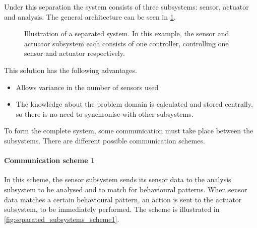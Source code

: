 Under this separation the system consists of three subsystems: sensor, actuator and analysis.  The general architecture can be seen in \cref{fig:separated_subsystems}.

\begin{figure}[htbp]
\centering
{}
\caption{Illustration of a separated system. In this example, the sensor and actuator subsystem each consists of one controller, controlling one sensor and actuator respectively.}\label{fig:separated_subsystems}
\end{figure}

This solution has the following advantages.

\begin{itemize} 
  \item Allows variance in the number of sensors used
  \item The knowledge about the problem domain is calculated and stored centrally, so there is no need to synchronise with other subsystems.
\end{itemize}
 
To form the complete system, some communication must take place between the subsystems. There are different possible communication schemes.

\paragraph{Communication scheme 1}

In this scheme, the sensor subsystem sends its sensor data to the analysis subsystem to be analysed and to match for behavioural patterns. When sensor data matches a certain behavioural pattern, an action is sent to the actuator subsystem, to be immediately performed. The scheme is illustrated in \cref{fig:separated_subsystems_scheme1}.


